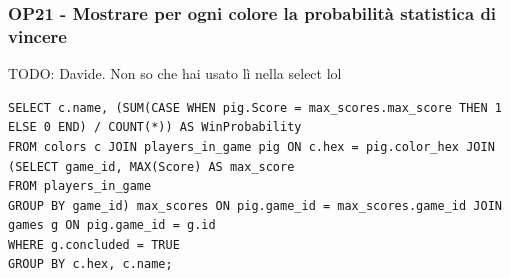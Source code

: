 \subsubsection*{OP21 - Mostrare per ogni colore la probabilità statistica di vincere}
TODO: Davide. Non so che hai usato lì nella select lol
\medskip

\begin{lstlisting}[style=sql]
SELECT c.name, (SUM(CASE WHEN pig.Score = max_scores.max_score THEN 1 ELSE 0 END) / COUNT(*)) AS WinProbability
FROM colors c JOIN players_in_game pig ON c.hex = pig.color_hex JOIN (SELECT game_id, MAX(Score) AS max_score
FROM players_in_game
GROUP BY game_id) max_scores ON pig.game_id = max_scores.game_id JOIN games g ON pig.game_id = g.id
WHERE g.concluded = TRUE
GROUP BY c.hex, c.name;
\end{lstlisting}
